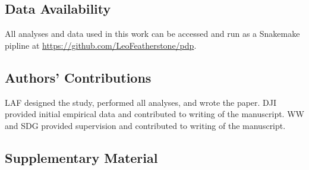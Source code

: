 \documentclass[12pt]{article}
\begin{document}
\begin{spacing}{2}
\subsection*{Data Availability}
All analyses and data used in this work can be accessed and run as a Snakemake pipline at \href{https://github.com/LeoFeatherstone/pdp}{https://github.com/LeoFeatherstone/pdp}.

\subsection*{Authors' Contributions}
LAF designed the study, performed all analyses, and wrote the paper. DJI provided initial empirical data and contributed to writing of the manuscript. WW and SDG provided supervision and contributed to writing of the manuscript.

\end{spacing}




\subsection*{Supplementary Material}

\renewcommand{\thefigure}{S\arabic{figure}}
\renewcommand{\thetable}{S\arabic{table}}
\setcounter{figure}{0}
\setcounter{table}{0}
\end{document}
